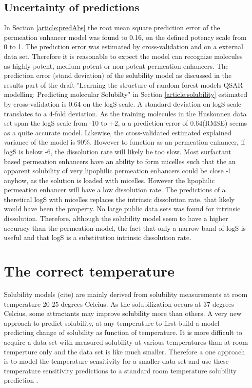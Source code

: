 \subsection{Uncertainty of predictions}
In Section \ref{article:predAbs} the root mean square prediction error of the permeation enhancer model was found to 0.16, on the defined potency scale from 0 to 1. The prediction error was estimated by cross-validation and on a external data set. Therefore it is reasonable to expect the model can recognize molecules as highly potent, medium potent or non-potent permeation enhancers. The prediction error (stand deviation) of the solubility model as discussed in the results part of the draft "Learning the structure of random forest models QSAR modelling: Predicting molecular Solubilty" in Section \ref{article:solubility} estimated by cross-validation is 0.64 on the logS scale. A standard deviation on logS scale translates to a 4-fold deviation. As the training molecules in the Huskonnen data set \cite{palmer2007random} span the logS scale from -10 to +2, a a prediction error of 0.64(RMSE) seems as a quite accurate model. Likewise, the cross-validated estimated explained variance of the model is 90\%. However to function as an permeation enhancer, if logS is below -6, the dissolution rate will likely be too slow. Most surfactant based permeation enhancers have an ability to form micelles such that the an apparent solubility of very lipophilic permeation enhancers could be close -1 anyhow, as the solution is loaded with micelles. However the lipophilic permeation enhancer will have a low dissolution rate. The predictions of a theretical logS with micelles replaces the intrinsic dissolution rate, that likely would have been the property. No large public data sets was found for intrinsic dissolution. Therefore, although the solubility model seem to have a higher accuracy than the permeation model, the fact that only a narrow band of logS is useful and that logS is a substitution intrinsic dissolution rate.

\section{The correct temperature}
Solubility models (cite) are mainly derived from solubility measurements at room temperature 20-25 degrees Celcius. As the solubilization occurs at 37 degrees Celcius, some attractants may improve solubility more than others. A very new approach to predict solubility, at any temperature to first build a model predicting change of solubility as function of temperature. It is more difficult to acquire a data set with measured solubility at various temperatures than at room temperture only and the data set is like much smaller. Therefore a one approach is to model the temperature sensitivity for a smaller data set and use these temperature sensitivity predictions to a standard room temperature solubility prediction \cite{klimenko2016novel}.

